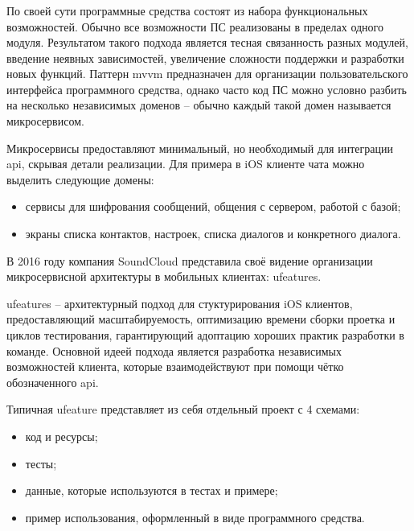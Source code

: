 \subsubsection{}
\label{sec:analysis:research:mobArch:ufeature}

По своей сути программные средства состоят из набора функциональных возможностей. Обычно все возможности ПС реализованы в пределах одного модуля. Результатом такого подхода является тесная связанность разных модулей, введение неявных зависимостей, увеличение сложности поддержки и разработки новых функций. Паттерн \gls{mvvm} предназначен для организации пользовательского интерфейса программного средства, однако часто код ПС можно условно разбить на несколько независимых доменов -- обычно каждый такой домен называется микросервисом.

Микросервисы предоставляют минимальный, но необходимый для интеграции \gls{api}, скрывая детали реализации. Для примера в iOS клиенте чата можно выделить следующие домены:

\begin{itemize}
	\item сервисы для шифрования сообщений, общения с сервером, работой с базой;
	\item экраны списка контактов, настроек, списка диалогов и конкретного диалога.
\end{itemize}

В 2016 году компания SoundCloud представила своё видение организации микросервисной архитектуры в мобильных клиентах: \glspl{ufeature}.

\glspl{ufeature} -- архитектурный подход для стуктурирования iOS клиентов, предоставляющий масштабируемость, оптимизацию времени сборки проетка и циклов тестирования, гарантирующий адоптацию хороших практик разработки в команде. Основной идеей подхода является разработка независимых возможностей клиента, которые взаимодействуют при помощи чётко обозначенного \gls{api}\cite{soundcloud:ufeature}.

Типичная \gls{ufeature} представляет из себя отдельный проект с 4 схемами:

\begin{itemize}
	\item код и ресурсы;
	\item тесты;
	\item данные, которые используются в тестах и примере;
	\item пример использования, оформленный в виде программного средства.
\end{itemize}

